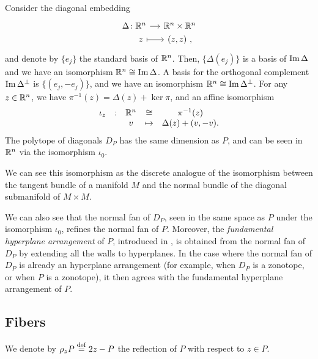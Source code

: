 Consider the diagonal embedding
\[
\begin{tikzcd}[row sep=0, column sep=small]
	\Delta \colon \R^n \arrow{r} & \R^n \times \R^n \\
	\phantom{\Delta \colon} z \arrow[r, |->] & (z,z) \ ,
\end{tikzcd}
\]
and denote by $\{e_j\}$ the standard basis of $\mathbb{R}^n$.
Then, $\{\Delta (e_j)\}$ is a basis of $\operatorname{\mathrm{Im}} \Delta$ and we have an isomorphism $\mathbb{R}^n \cong \operatorname{\mathrm{Im}} \Delta$.
A basis for the orthogonal complement $\operatorname{\mathrm{Im}} \Delta^{\bot}$ is $\{(e_j,-e_j)\}$, and we have an isomorphism $\mathbb{R}^n \cong \operatorname{\mathrm{Im}} \Delta^{\bot}$.
For any $z \in \mathbb{R}^n$, we have $\pi^{-1}(z)=\Delta(z)+\ker \pi$, and an affine isomorphism
\begin{equation} \label{eq:D_P-iso}
	\begin{matrix}
		\iota_z & : & \mathbb{R}^n & \cong & \pi^{-1}(z) \\
		& & v & \mapsto & \Delta(z)+(v,-v).
	\end{matrix}
\end{equation}
The polytope of diagonals $D_P$ has the same dimension as $P$, and can be seen in $\mathbb{R}^n$ via the isomorphism $\iota_0$.

\begin{remark}
	We can see this isomorphism as the discrete analogue of the isomorphism between the tangent bundle of a manifold $M$ and the normal bundle of the diagonal submanifold of $M\times M$.
\end{remark}

We can also see that the normal fan of $D_P$, seen in the same space as $P$ under the isomorphism $\iota_0$, refines the normal fan of $P$.
Moreover, the \emph{fundamental hyperplane arrangement} of $P$, introduced in \cite[Definition 1.18]{GLA21}, is obtained from the normal fan of $D_P$ by extending all the walls to hyperplanes.
In the case where the normal fan of $D_P$ is already an hyperplane arrangement (for example, when $D_P$ is a zonotope, or when $P$ is a zonotope), it then agrees with the fundamental hyperplane arrangement of $P$.

\subsection{Fibers}


We denote by $\rho_z P \stackrel{\mathrm{def}}{=} 2z-P$ the reflection of $P$ with respect to $z \in P$.

